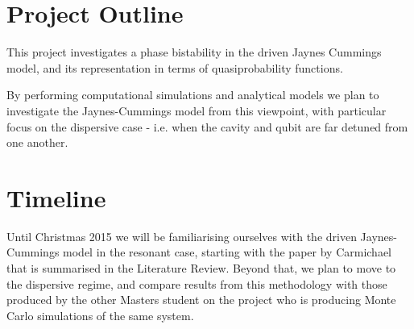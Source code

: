 

\section{Project Outline}
This project investigates a phase bistability in the driven Jaynes Cummings model, and its representation in terms of quasiprobability functions. 

By performing computational simulations and analytical models we plan to investigate the Jaynes-Cummings model from this viewpoint, with particular focus on the dispersive case - i.e. when the cavity and qubit are far detuned from one another. 

\section{Timeline}
Until Christmas 2015 we will be familiarising ourselves with the driven Jaynes-Cummings model in the resonant case, starting with the paper by Carmichael that is summarised in the Literature Review. Beyond that, we plan to move to the dispersive regime, and compare results from this methodology with those produced by the other Masters student on the project who is producing Monte Carlo simulations of the same system.


